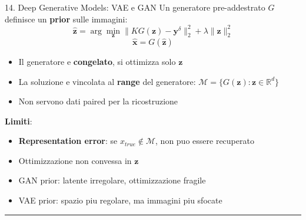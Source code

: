 \documentclass[italian,10pt]{beamer}
\begin{document}
\begin{frame}[allowframebreaks]{14. Deep Generative Models: VAE e GAN}
Un generatore pre-addestrato $G$ definisce un \textbf{prior} sulle immagini:
\[ \hat{\boldsymbol{z}} = \arg\min_{\boldsymbol{z}} \|K G(\boldsymbol{z}) - \boldsymbol{y}^\delta\|_2^2 + \lambda \|\boldsymbol{z}\|_2^2 \]
\[ \hat{\boldsymbol{x}} = G(\hat{\boldsymbol{z}}) \]
\begin{itemize}
\item Il generatore e \textbf{congelato}, si ottimizza solo $\boldsymbol{z}$
\item La soluzione e vincolata al \textbf{range} del generatore: $\mathcal{M} = \{G(\boldsymbol{z}) : \boldsymbol{z} \in \mathbb{R}^d\}$
\item Non servono dati paired per la ricostruzione
\end{itemize}
\textbf{Limiti}:
\begin{itemize}
\item \textbf{Representation error}: se $x_{true} \notin \mathcal{M}$, non puo essere recuperato
\item Ottimizzazione non convessa in $\boldsymbol{z}$
\item GAN prior: latente irregolare, ottimizzazione fragile
\item VAE prior: spazio piu regolare, ma immagini piu sfocate
\end{itemize}
\medskip\noindent\rule{\textwidth}{0.4pt}\medskip
\end{frame}
\end{document}
